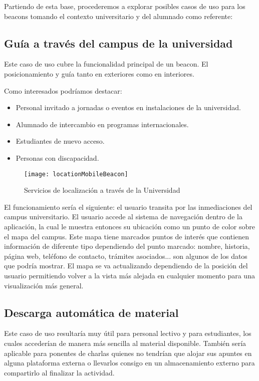 Partiendo de esta base, procederemos a explorar posibles casos de uso para los beacons tomando el contexto universitario y del alumnado como referente:

\subsection{Guía a través del campus de la universidad}

Este caso de uso cubre la funcionalidad principal de un beacon. El posicionamiento y guía tanto en exteriores como en interiores. 

Como interesados podríamos destacar: 

\begin{itemize}
\item Personal invitado a jornadas o eventos en instalaciones de la universidad.
\item Alumnado de intercambio en programas internacionales.
\item Estudiantes de nuevo acceso.
\item Personas con discapacidad.
\end{itemize}

\begin{figure}[h]
	\centering
	\texttt{[image: locationMobileBeacon]}
	\caption{Servicios de localización a través de la Universidad}
	\label{fig:beaconLocation}
\end{figure}

El funcionamiento sería el siguiente: el usuario transita por las inmediaciones del campus universitario. El usuario accede al sistema de navegación dentro de la aplicación, la cual le muestra entonces su ubicación como un punto de color sobre el mapa del campus. Este mapa tiene marcados puntos de interés que contienen información de diferente tipo dependiendo del punto marcado: nombre, historia, página web, teléfono de contacto, trámites asociados... son algunos de los datos que podría mostrar. El mapa se va actualizando dependiendo de la posición del usuario permitiendo volver a la vista más alejada en cualquier momento para una visualización más general.


\subsection{Descarga automática de material} \label{sec:descargaautomatica}

Este caso de uso resultaría muy útil para personal lectivo y para estudiantes, los cuales accederían de manera más sencilla al material disponible. También sería aplicable para ponentes de charlas quienes no tendrían que alojar sus apuntes en alguna plataforma externa o llevarlos consigo en  un almacenamiento externo para compartirlo al finalizar la actividad.

